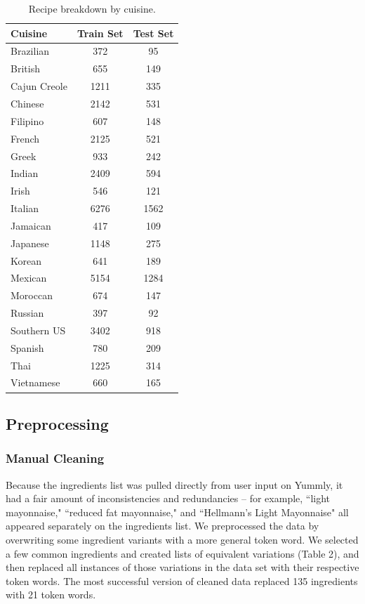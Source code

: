 \documentclass[11pt]{article}
\begin{document}
\begin{table}
\centering
    \begin{tabular}{ | l | c | c |}
      \hline
      Cuisine & Train Set & Test Set \\
      \hline
      Brazilian & 372 & 95 \\
      British & 655 & 149 \\
      Cajun Creole & 1211 & 335 \\
      Chinese & 2142 & 531 \\
      Filipino & 607 & 148 \\
      French & 2125 & 521 \\
      Greek & 933 & 242 \\
      Indian & 2409 & 594 \\
      Irish & 546 & 121 \\
      Italian & 6276 & 1562 \\
      Jamaican & 417 & 109 \\
      Japanese & 1148 & 275 \\
      Korean & 641 & 189 \\
      Mexican & 5154 & 1284 \\
      Moroccan & 674 & 147 \\
      Russian & 397 & 92 \\
      Southern US & 3402 & 918 \\
      Spanish & 780 & 209 \\
      Thai & 1225 & 314 \\
      Vietnamese & 660 & 165 \\
      \hline
    \end{tabular}
    \caption{\label{tab:Table1}Recipe breakdown by cuisine.}
\end{table}


\subsection{Preprocessing}
\subsubsection{Manual Cleaning}
Because the ingredients list was pulled directly from user input on Yummly, it had a fair amount of inconsistencies and redundancies
-- for example, ``light mayonnaise," ``reduced fat mayonnaise," and ``Hellmann's Light Mayonnaise" all appeared separately on the ingredients list.
We preprocessed the data by overwriting some ingredient variants with a more general token word. We selected a few common ingredients and created lists of equivalent variations (Table 2), and then replaced all instances of those variations in the data set with their respective token words.
The most successful version of cleaned data replaced 135 ingredients with 21 token words.
\end{document}
